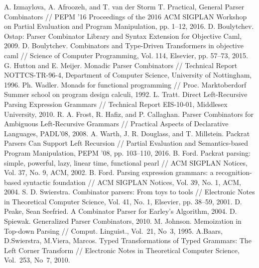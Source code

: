 \documentclass[conference]{IEEEtran}
\begin{document}
\begin{thebibliography}{00}
 A. Izmaylova, A. Afroozeh, and T. van der Storm T. Practical, General Parser Combinators // PEPM '16 Proceedings of the 2016 ACM SIGPLAN Workshop on Partial Evaluation and Program Manipulation, pp. 1--12, 2016.
 D. Boulytchev. Ostap: Parser Combinator Library and Syntax Extension for Objective Caml, 2009.
 D. Boulytchev. Combinators and Type-Driven Transformers in objective caml // Science of Computer Programming, Vol. 114, Elsevier, pp. 57--73, 2015.
 G. Hutton and E. Meijer. Monadic Parser Combinators // Technical Report NOTTCS-TR-96-4, Department of Computer Science, University of Nottingham, 1996.
 Ph. Wadler. Monads for functional programming // Proc. Marktoberdorf Summer school on program design calculi, 1992.
 L. Tratt. Direct Left-Recursive Parsing Expression Grammars // Technical Report EIS-10-01, Middlesex University, 2010.
 R. A. Frost, R. Hafiz, and P. Callaghan. Parser Combinators for Ambiguous Left-Recursive Grammars // Practical Aspects of Declarative Languages, PADL’08, 2008.
 A. Warth, J. R. Douglass, and T. Millstein. Packrat Parsers Can Support Left Recursion // Partial Evaluation and Semantics-based Program Manipulation, PEPM ’08, pp. 103--110, 2016.
 B. Ford. Packrat parsing: simple, powerful, lazy, linear time, functional pearl // ACM SIGPLAN Notices, Vol. 37, No. 9, ACM, 2002.
 B. Ford. Parsing expression grammars: a recognition-based syntactic foundation // ACM SIGPLAN Notices, Vol. 39, No. 1, ACM, 2004.
 S. D. Swierstra. Combinator parsers: From toys to tools // Electronic Notes in Theoretical Computer Science, Vol. 41, No. 1, Elsevier, pp. 38--59, 2001.
 D. Peake, Sean Seefried. A Combinator Parser for Earley's Algorithm, 2004.
 D. Spiewak. Generalized Parser Combinators, 2010.
 M. Johnson. Memoization in Top-down Parsing // Comput. Linguist., Vol.~21, No~3, 1995.
 A.Baars, D.Swierstra, M.Viera, Marcos. Typed Transformations of Typed Grammars: The Left Corner Transform // Electronic Notes in Theoretical Computer
Science,  Vol.~253, No~7, 2010. 
\end{thebibliography}
\end{document}
